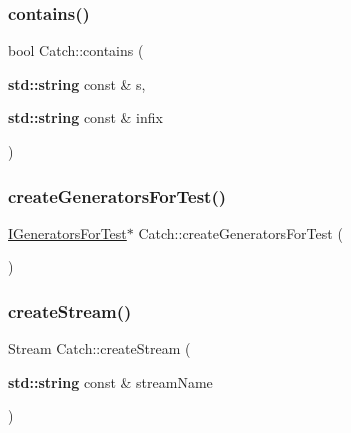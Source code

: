 \mbox{\label{namespace_catch_aa52974b0e426e7e2fbd725a900e9c36e}} 
\subsubsection{\texorpdfstring{contains()}{contains()}}
{\footnotesize\ttfamily bool Catch\+::contains (\begin{DoxyParamCaption}\item[{\textbf{ std\+::string} const \&}]{s,  }\item[{\textbf{ std\+::string} const \&}]{infix }\end{DoxyParamCaption})}

\mbox{\label{namespace_catch_a3d93b31e88fd01ee9e0d20757ff64eab}} 
\subsubsection{\texorpdfstring{create\+Generators\+For\+Test()}{createGeneratorsForTest()}}
{\footnotesize\ttfamily \hyperlink{struct_catch_1_1_i_generators_for_test}{I\+Generators\+For\+Test}$\ast$ Catch\+::create\+Generators\+For\+Test (\begin{DoxyParamCaption}{ }\end{DoxyParamCaption})}

\mbox{\label{namespace_catch_ad7591011c5d99d59504ecd3384001c3e}} 
\subsubsection{\texorpdfstring{create\+Stream()}{createStream()}}
{\footnotesize\ttfamily Stream Catch\+::create\+Stream (\begin{DoxyParamCaption}\item[{\textbf{ std\+::string} const \&}]{stream\+Name }\end{DoxyParamCaption})}

\mbox{\label{namespace_catch_aadf9786550a462740ec355f8219863a9}} 
